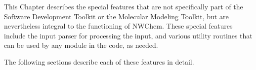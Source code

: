 \label{sec:utilities}

This Chapter describes the special features that are
not specifically part of the Software Development Toolkit or the Molecular
Modeling Toolkit, but are nevertheless integral to the functioning of NWChem.
These special features include the input parser for processing the input,
and various utility routines that can be used by any module in the code, as
needed.

The following sections describe each of these features in detail.


